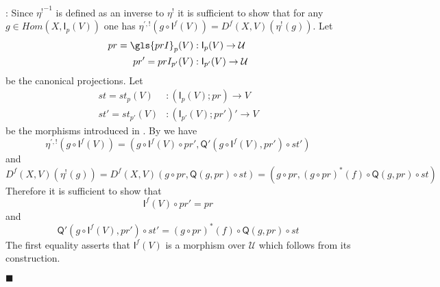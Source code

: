 \documentclass[12pt]{article}
\numberwithin{equation}{section}
\newenvironment{myproof}{{\bf Proof}:}{$\blacksquare$ \vskip 5mm }
\newcommand{\sr}{\rightarrow}
\newcommand{\U}{\mathcal{U}}
\newcommand{\I}{\mathsf{I}}
\newcommand{\Q}{\mathsf{Q}}
\newcommand{\etashriek}{\eta^!}
\newcommand{\etaunshriek}{{\etashriek}^{-1}}
\begin{document}
\begin{myproof}
Since $\etaunshriek$ is defined as an inverse to $\etashriek$ it is sufficient to show that
for any $g\in Hom(X,\I_p(V))$ one has $\eta^{',!}(g\circ
\I^f(V))=D^f(X,V)(\etashriek(g))$. Let
%
\begin{align*}
  pr=\gls{prI}_p(V) & :\I_p(V)\sr \U \\
  pr'=prI_{p'}(V) & :\I_{p'}(V)\sr \U
\end{align*}
%
be the canonical projections. Let
%
\begin{align*}
  st=st_p(V)&:(\I_p(V);pr)\sr V \\
  st'=st_{p'}(V)&:(\I_{p'}(V);pr')'\sr V
\end{align*}
%
be the morphisms introduced in \cite{fromunivwithPi}. By \cite[Problem
  3.8]{fromunivwithPi} we have
%
$$\eta^{',!}(g\circ \I^f(V))=(g\circ \I^f(V)\circ pr', \Q'(g\circ \I^f(V),
pr')\circ st')$$
%
and
%
$$D^f(X,V)(\etashriek(g))=D^f(X,V)(g\circ pr, \Q(g,pr)\circ st)=(g\circ pr, (g\circ
pr)^*(f)\circ \Q(g,pr)\circ st)$$
%
Therefore it is sufficient to show that
%
$$\I^f(V)\circ pr'=pr$$
%
and
%
$$\Q'(g\circ \I^f(V), pr')\circ st'=(g\circ pr)^*(f)\circ \Q(g,pr)\circ st$$
%
The first equality asserts that $\I^f(V)$ is a morphism over $\U$ which follows
from its construction.


\end{myproof}
\end{document}
